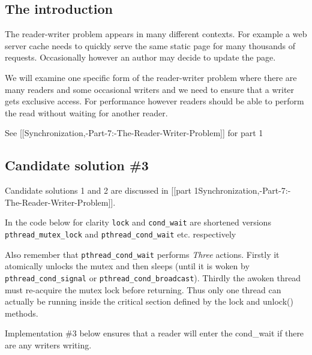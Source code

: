 \subsection{The introduction}\label{the-introduction}

The reader-writer problem appears in many different contexts. For
example a web server cache needs to quickly serve the same static page
for many thousands of requests. Occasionally however an author may
decide to update the page.

We will examine one specific form of the reader-writer problem where
there are many readers and some occasional writers and we need to ensure
that a writer gets exclusive access. For performance however readers
should be able to perform the read without waiting for another reader.

See {[}{[}Synchronization,-Part-7:-The-Reader-Writer-Problem{]}{]} for
part 1

\subsection{Candidate solution \#3}\label{candidate-solution-3}

Candidate solutions 1 and 2 are discussed in {[}{[}part
1\textbar{}Synchronization,-Part-7:-The-Reader-Writer-Problem{]}{]}.

In the code below for clarity \texttt{lock} and \texttt{cond\_wait} are
shortened versions \texttt{pthread\_mutex\_lock} and
\texttt{pthread\_cond\_wait} etc. respectively

Also remember that \texttt{pthread\_cond\_wait} performs \emph{Three}
actions. Firstly it atomically unlocks the mutex and then sleeps (until
it is woken by \texttt{pthread\_cond\_signal} or
\texttt{pthread\_cond\_broadcast}). Thirdly the awoken thread must
re-acquire the mutex lock before returning. Thus only one thread can
actually be running inside the critical section defined by the lock and
unlock() methods.

Implementation \#3 below ensures that a reader will enter the cond\_wait
if there are any writers writing.

\begin{Shaded}
\begin{Highlighting}[]
     


\NormalTok{\}}
\end{Highlighting}
\end{Shaded}

